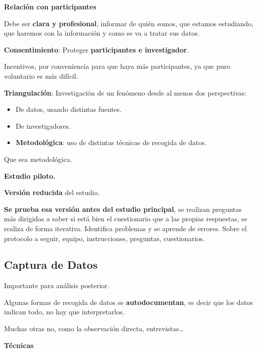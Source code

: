 \documentclass[12pt, twoside, openright]{report} %
\begin{document}
\textbf{Relación con participantes}

Debe ser \textbf{clara y profesional}, informar de quién somos, que
estamos estudiando, que haremos con la información y como se va a tratar
sus datos.

\textbf{Consentimiento}: Proteger \textbf{participantes e investigador}.

Incentivos, por conveniencia para que haya más participantes, ya que
puro voluntario es más difícil.

\textbf{Triangulación}: Investigación de un fenómeno desde al menos dos
perspectivas:

\begin{itemize}
	\item De datos, usando distintas fuentes.
	\item De investigadores.
	\item \textbf{Metodológica}: uso de distintas técnicas de recogida de datos.
\end{itemize}

Que sea metodológica.

\textbf{Estudio piloto.}

\textbf{Versión reducida} del estudio.

\textbf{Se prueba esa versión antes del estudio principal}, se realizan
preguntas más dirigidas a saber si está bien el cuestionario que a las
propias respuestas, se realiza de forma iterativa. Identifica problemas
y se aprende de errores. Sobre el protocolo a seguir, equipo,
instrucciones, preguntas, cuestionarios.

\subsection{Captura de Datos}

Importante para análisis posterior.

Algunas formas de recogida de datos se \textbf{autodocumentan}, es decir que los datos indican todo, no hay que interpretarlos.

Muchas otras no, como la observación directa, entrevistas\ldots{}

\newpage

\textbf{Técnicas}
\end{document}
